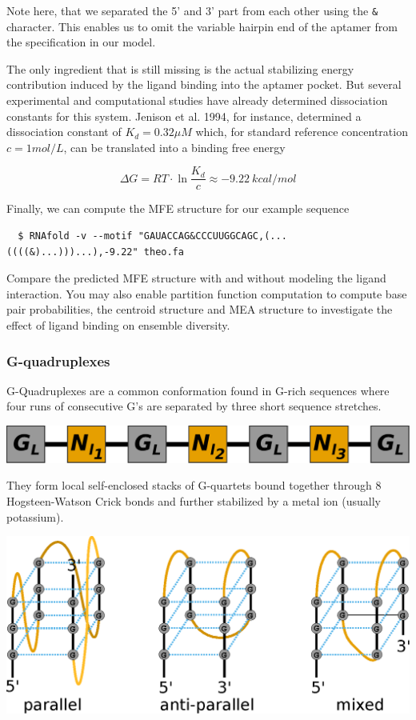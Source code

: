 \documentclass[a4paper]{article}
\begin{document}
Note here, that we separated the 5' and 3' part from each other using the \texttt{\&}
character. This enables us to omit the variable hairpin end of the aptamer from the
specification in our model.

The only ingredient that is still missing is the actual stabilizing energy contribution
induced by the ligand binding into the aptamer pocket. But several experimental and computational
studies have already determined dissociation constants for this system. Jenison et al. 1994,
for instance, determined a dissociation constant of $K_d = 0.32\mu M$ which, for standard
reference concentration $c = 1 mol/L$, can be translated into a binding free energy

$$\Delta G = RT \cdot \ln \frac{K_d}{c} \approx -9.22~kcal/mol$$

Finally, we can compute the MFE structure for our example sequence

\begin{verbatim}
  $ RNAfold -v --motif "GAUACCAG&CCCUUGGCAGC,(...((((&)...)))...),-9.22" theo.fa
\end{verbatim}

Compare the predicted MFE structure with and without modeling the ligand interaction.
You may also enable partition function computation to compute base pair probabilities,
the centroid structure and MEA structure to investigate the effect of ligand binding
on ensemble diversity.

\subsubsection{G-quadruplexes}
G-Quadruplexes are a common conformation found in G-rich sequences where four runs of
consecutive G's are separated by three short sequence stretches.

\begin{center}
\includegraphics[width=.5\textwidth]{Figures/gquad_pattern.eps}\\
\end{center}

They form local
self-enclosed stacks of G-quartets bound together through 8 Hogsteen-Watson Crick bonds
and further stabilized by a metal ion (usually potassium).

\begin{center}
\includegraphics[width=.85\textwidth]{Figures/gquad.eps}\\
\end{center}
\end{document}

